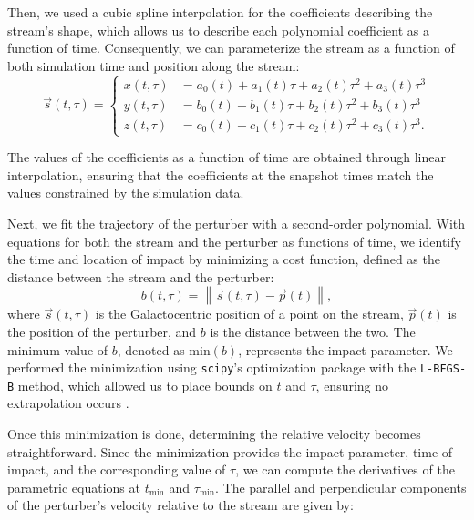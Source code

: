         Then, we used a cubic spline interpolation for the coefficients describing the stream's shape, which allows us to describe each polynomial coefficient as a function of time. Consequently, we can parameterize the stream as a function of both simulation time and position along the stream:
        \begin{equation}
            \vec{s}(t,\tau) = 
            \left\{
            \begin{aligned}
            x(t,\tau) &= a_0(t) + a_1(t)\tau + a_2(t) \tau^2 + a_3(t)\tau^3 \\ 
            y(t,\tau) &= b_0(t) + b_1(t)\tau + b_2(t) \tau^2 + b_3(t)\tau^3 \\
            z(t,\tau) &= c_0(t) + c_1(t)\tau + c_2(t) \tau^2 + c_3(t)\tau^3.
            \end{aligned}
            \right.
        \end{equation}
        
        The values of the coefficients as a function of time are obtained through linear interpolation, ensuring that the coefficients at the snapshot times match the values constrained by the simulation data.

        Next, we fit the trajectory of the perturber with a second-order polynomial. With equations for both the stream and the perturber as functions of time, we identify the time and location of impact by minimizing a cost function, defined as the distance between the stream and the perturber:
        \begin{equation} 
            b(t, \tau) = \left\lVert \vec{s}(t, \tau) - \vec{p}(t) \right\rVert, 
        \end{equation}
        where $\vec{s}(t, \tau)$ is the Galactocentric position of a point on the stream, $\vec{p}(t)$ is the position of the perturber, and $b$ is the distance between the two. The minimum value of $b$, denoted as $\text{min}(b)$, represents the impact parameter. We performed the minimization using \texttt{scipy}'s optimization package with the \texttt{L-BFGS-B} method, which allowed us to place bounds on $t$ and $\tau$, ensuring no extrapolation occurs \citep{davidon1991variable}.

        Once this minimization is done, determining the relative velocity becomes straightforward. Since the minimization provides the impact parameter, time of impact, and the corresponding value of $\tau$, we can compute the derivatives of the parametric equations at $t_{\text{min}}$ and $\tau_{\text{min}}$. The parallel and perpendicular components of the perturber's velocity relative to the stream are given by:

